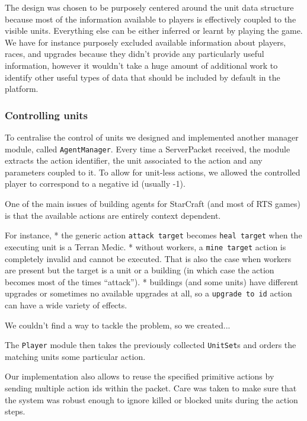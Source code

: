 The design was chosen to be purposely centered around the unit data structure
because most of the information available to players is effectively coupled to
the visible units. Everything else can be either inferred or learnt by playing
the game. We have for instance purposely excluded available information about
players, races, and upgrades because they didn't provide any particularly useful
information, however it wouldn't take a huge amount of additional work to
identify other useful types of data that should be included by default in the
platform.


\subsubsection{Controlling units}

To centralise the control of units we designed and implemented another manager
module, called \texttt{AgentManager}. Every time a ServerPacket received, the
module extracts the action identifier, the unit associated to the action and any
parameters coupled to it. To allow for unit-less actions, we allowed the
controlled player to correspond to a negative id (usually -1).

One of the main issues of building agents for StarCraft (and most of RTS games)
is that the available actions are entirely context dependent. 

For instance, 
* the generic action \texttt{attack target} becomes \texttt{heal
  target} when the executing unit is a Terran Medic. 
* without workers, a \texttt{mine target} action is completely invalid and
cannot be executed. That is also the case when workers are present but the
target is a unit or a building (in which case the action becomes most of the
times ``attack'').
* buildings (and some units) have different upgrades or sometimes no available upgrades at
all, so a \texttt{upgrade to id} action can have a wide variety of effects. 

We couldn't find a way to tackle the problem, so we created...

The \texttt{Player} module then takes the previously collected \texttt{UnitSet}s
and orders the matching units some particular action.

Our implementation also allows to reuse the specified primitive actions by sending
multiple action ids within the packet. 
Care was taken to make sure that the system was robust enough to ignore killed
or blocked units during the action steps.

